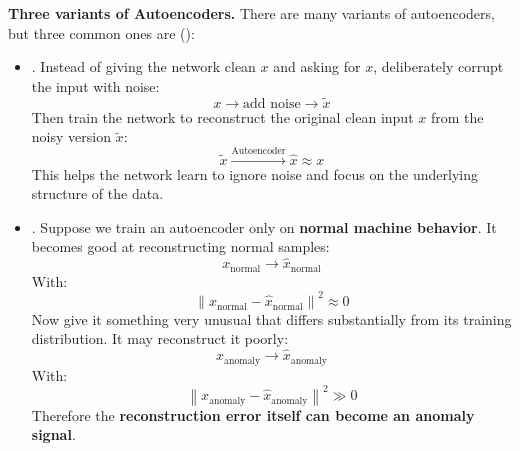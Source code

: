 \highspace
\textcolor{Green3}{ \textbf{Three variants of Autoencoders.}} There are many variants of autoencoders, but three common ones are ():
\begin{itemize}
    \item {}. Instead of giving the network clean $x$ and asking for $x$, deliberately corrupt the input with noise:
        \begin{equation*}
            x \to \text{add noise} \to \tilde{x}
        \end{equation*}
        Then train the network to reconstruct the original clean input $x$ from the noisy version $\tilde{x}$:
        \begin{equation*}
            \tilde{x} \xrightarrow{\text{Autoencoder}} \hat{x} \approx x
        \end{equation*}
        This helps the network learn to ignore noise and focus on the underlying structure of the data.

    \item {}. Suppose we train an autoencoder only on \textbf{normal machine behavior}. It becomes good at reconstructing normal samples:
        \begin{equation*}
            x_{\text{normal}} \to \hat{x}_{\text{normal}}
        \end{equation*}
        With:
        \begin{equation*}
            \left\|x_{\text{normal}} - \hat{x}_{\text{normal}}\right\|^2 \approx 0
        \end{equation*}
        Now give it something very unusual that differs substantially from its training distribution. It may reconstruct it poorly:
        \begin{equation*}
            x_{\text{anomaly}} \to \hat{x}_{\text{anomaly}}
        \end{equation*}
        With:
        \begin{equation*}
            \left\|x_{\text{anomaly}} - \hat{x}_{\text{anomaly}}\right\|^2 \gg 0
        \end{equation*}
        Therefore the \textbf{reconstruction error itself can become an anomaly signal}.


\end{itemize}
